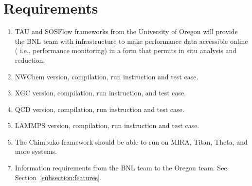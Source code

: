 \section{Requirements}



\begin{enumerate}[label=R-\arabic*)]
\item TAU and SOSFlow frameworks from the University of Oregon will provide the BNL team with infrastructure to make performance data accessible online ( i.e., performance monitoring) in a form that permits in situ analysis and reduction.
\item NWChem version, compilation, run instruction and test case.
\item XGC version, compilation, run instruction, and test case.
\item QCD version, compilation, run instruction and test case. 
\item LAMMPS version, compilation, run instruction and test case.
\item The Chimbuko framework should be able to run on MIRA, Titan, Theta, and more systems.
\item Information requirements from the BNL team to the Oregon team. See Section~\ref{subsection:features}.
\end{enumerate}

